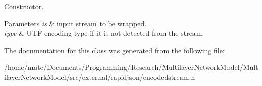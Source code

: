 Constructor. 


\begin{DoxyParams}{Parameters}
{\em is} & input stream to be wrapped. \\
\hline
{\em type} & U\+TF encoding type if it is not detected from the stream. \\
\hline
\end{DoxyParams}


The documentation for this class was generated from the following file\+:\begin{DoxyCompactItemize}
\item 
/home/mate/\+Documents/\+Programming/\+Research/\+Multilayer\+Network\+Model/\+Multilayer\+Network\+Model/src/external/rapidjson/encodedstream.\+h\end{DoxyCompactItemize}
